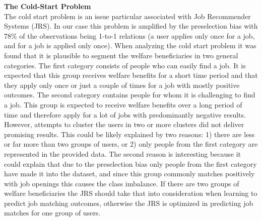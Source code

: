 \noindent
\textbf{The Cold-Start Problem}\\
The cold start problem is an issue particular associated with Job Recommender Systems (JRS). In our case this problem is amplified by the preselection bias with 78\% of the observations being 1-to-1 relations (a user applies only once for a job, and for a job is applied only once). 
When analyzing the cold start problem it was found that it is plausible to segment the welfare beneficiaries in two general categories.
The first category consists of people who can easily find a job. 
It is expected that this group receives welfare benefits for a short time period and that they apply only once or just a couple of times for a job with mostly positive outcomes. 
The second category contains people for whom it is challenging to find a job. 
This group is expected to receive welfare benefits over a long period of time and therefore apply for a lot of jobs with predominantly negative results.
However, attempts to cluster the users in two or more clusters did not deliver promising results.
This could be likely explained by two reasons: 1) there are less or far more than two groups of users, or 2) only people from the first category are represented in the provided data. 
The second reason is interesting because it could explain that due to the preselection bias only people from the first category have made it into the dataset, and since this group commonly matches positively with job openings this causes the class imbalance.
If there are two groups of welfare beneficiaries the JRS should take that into consideration when learning to predict job matching outcomes, otherwise the JRS is optimized in predicting job matches for one group of users. 

